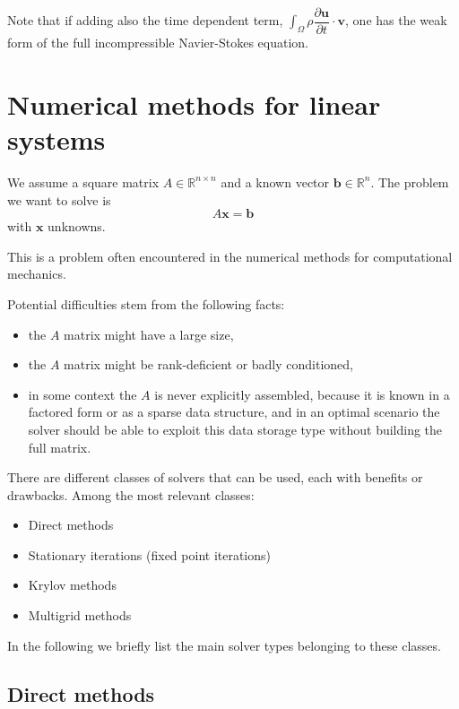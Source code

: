 \documentclass{digitaldynamics}
\def\vect#1{\bm{#1}}
\def\matr#1{{#1}}
\begin{document}
\begin{itemize}
	Note that if adding also the time dependent term, $\displaystyle \int_{\Omega}\rho \dfrac{\partial \boldsymbol u}{\partial t}\cdot \boldsymbol v$, one has the weak form of the full incompressible Navier-Stokes equation.
	
	
\end{itemize}





\newpage
\section{Numerical methods for linear systems}

We assume a square matrix $\matr{A}  \in \mathbb{R}^{n \times n}$ and a known vector $\vect{b} \in \mathbb{R}^n$. 
The problem we want to solve is
\[
\matr{A} \vect{x} = \vect{b}
\]
with $\vect{x}$ unknowns.

This is a problem often encountered in the numerical methods for computational mechanics.

Potential difficulties stem from the following facts: 

\begin{itemize}
	\item the $\matr{A}$ matrix might have a large size,
	\item the $\matr{A}$ matrix might be rank-deficient or badly conditioned,
	\item in some context the $\matr{A}$ is never explicitly assembled, because it is known in a factored form or as a sparse data structure, and in an optimal scenario the solver should be able to exploit this data storage type without building the full matrix.
\end{itemize}

There are different classes of solvers that can be used, each with benefits or drawbacks. Among the most relevant classes:
\begin{itemize}
	\item Direct methods
	\item Stationary iterations (fixed point iterations)
	\item Krylov methods
	\item Multigrid methods
\end{itemize}
In the following we briefly list the main solver types belonging to these classes.


\subsection{Direct methods}
\end{document}

